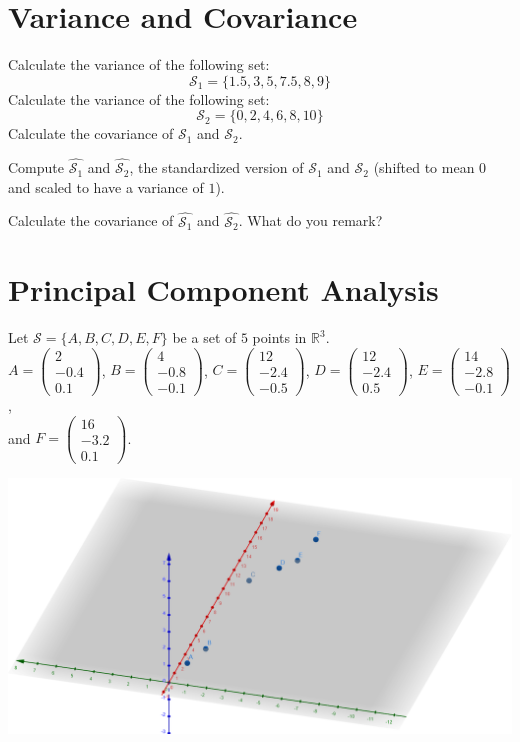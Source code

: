 \documentclass[]{article}
\begin{document}
	\section{Variance and Covariance}
	Calculate the variance of the following set:
	$$
	\mathcal{S}_1 = \{ 1.5, 3, 5, 7.5, 8, 9 \}
	$$
	Calculate the variance of the following set:
	$$
	\mathcal{S}_2 = \{ 0, 2, 4, 6, 8, 10 \}
	$$
	Calculate the covariance of $\mathcal{S}_1$ and $\mathcal{S}_2$.
	
	Compute $\hat{\mathcal{S}_1}$ and $\hat{\mathcal{S}_2}$, the standardized version of $\mathcal{S}_1$ and $\mathcal{S}_2$ (shifted to mean $0$ and scaled to have a variance of $1$).
	
	Calculate the covariance of $\hat{\mathcal{S}_1}$ and $\hat{\mathcal{S}_2}$. What do you remark?

	\section{Principal Component Analysis}
	Let $\mathcal{S} = \{ A, B, C, D, E, F \}$ be a set of $5$ points in $\mathbb{R}^3$.\\
	$A = \begin{pmatrix} 2 \\ -0.4 \\ 0.1 \end{pmatrix}$,
	$B = \begin{pmatrix} 4 \\ -0.8 \\ -0.1 \end{pmatrix}$,
	$C = \begin{pmatrix} 12 \\ -2.4 \\ -0.5 \end{pmatrix}$,
	$D = \begin{pmatrix} 12 \\ -2.4 \\ 0.5 \end{pmatrix}$,
	$E = \begin{pmatrix} 14 \\ -2.8 \\ -0.1 \end{pmatrix}$,\\
	and $F = \begin{pmatrix} 16 \\ -3.2 \\ 0.1 \end{pmatrix}$.
	
	\begin{center}
		\vspace{0.2cm}
		\includegraphics[width=0.75\linewidth]{points}
		\vspace{0.2cm}
	\end{center}
	
\end{document}
